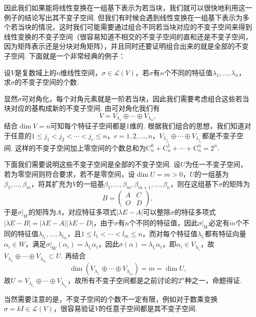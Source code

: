因此我们如果能将线性变换在一组基下表示为若当块，我们就可以很快地利用这一例子的结论写出其不变子空间. 但我们有时候会遇到线性变换在一组基下表示为多个若当块的情况，这时我们可能需要通过组合不同若当块对应的不变子空间来得到线性变换的不变子空间（很容易知道不相交的不变子空间的直和还是不变子空间，因为矩阵表示还是分块对角矩阵），并且同时还要证明组合出来的就是全部的不变子空间. 下面就是一个非常经典的例子：
\begin{example}{}{}
    设$V$是复数域上的$n$维线性空间，$\sigma\in\mathcal{L}(V)$，若$\sigma$有$n$个不同的特征值$\lambda_1,\ldots,\lambda_n$，求$\sigma$的不变子空间的个数.
\end{example}
\begin{solution}
    显然$\sigma$可对角化，每个对角元素就是一阶若当块，因此我们需要考虑组合这些若当块对应的基构成新的不变子空间. 由可对角化我们有
    \[V=V_{\lambda_1}\oplus\cdots\oplus V_{\lambda_n},\]
    结合$\dim V=n$可知每个特征子空间都是1维的. 根据我们组合的思想，我们知道对于任意的$1\leqslant j_1<j_2<\cdots<j_r\leqslant n$，$r=1,2,\ldots,n$，$V_{\lambda_{j_1}}\oplus\cdots\oplus V_{\lambda_{j_r}}$都是不变子空间. 这样的不变子空间加上零空间的个数总和为$\mathrm{C}_n^0+\mathrm{C}_n^1+\cdots+\mathrm{C}_n^n=2^n$.

    下面我们需要说明这些不变子空间是全部的不变子空间. 设$U$为任一不变子空间，若为零空间则符合要求，若不是零空间，设$\dim U=m>0$，$U$的一组基为$\beta_1,\ldots,\beta_m$，将其扩充为$V$的一组基$\beta_1,\ldots,\beta_m,\beta_{m+1},\ldots,\beta_n$，则在这组基下$\sigma$的矩阵为
    \[B=\begin{pmatrix}
            A & C \\ O & D
        \end{pmatrix},\]
    于是$\sigma\vert_W$的矩阵为$A$，对应特征多项式$|\lambda E-A|$可以整除$\sigma$的特征多项式$|\lambda E-B|=|\lambda E-A||\lambda E-D|$，由于$\sigma$有$n$个不同的特征值，因此$\sigma\vert_W$必定有$m$个不同的特征值$\lambda_{l_1},\ldots,\lambda_{l_m}$，且$1\leqslant l_1<\cdots<l_m\leqslant n$，而对每个特征值$\lambda_{l_i}$都有特征向量$\alpha_i\in W$，满足$\sigma\vert_W(\alpha_i)=\lambda_{l_i}\alpha_i$，因此$\sigma(\alpha)=\lambda_{l_i}\alpha_i$，即$\alpha_i\in V_{\lambda_{l_i}}$，故$V_{\lambda_{l_1}}\oplus\cdots\oplus V_{\lambda_{l_m}}\subset U$. 再结合
    \[\dim(V_{\lambda_{l_1}}\oplus\cdots\oplus V_{\lambda_{l_m}})=m=\dim U,\]
    故$U=V_{\lambda_{l_1}}\oplus\cdots\oplus V_{\lambda_{l_m}}$，故所有不变子空间都是之前讨论的$2^n$种之一，命题得证.
\end{solution}

当然需要注意的是，不变子空间的个数不一定有限，例如对于数乘变换$\sigma=kI\in\mathcal{L}(V)$，很容易验证$V$的任意子空间都是其不变子空间.

